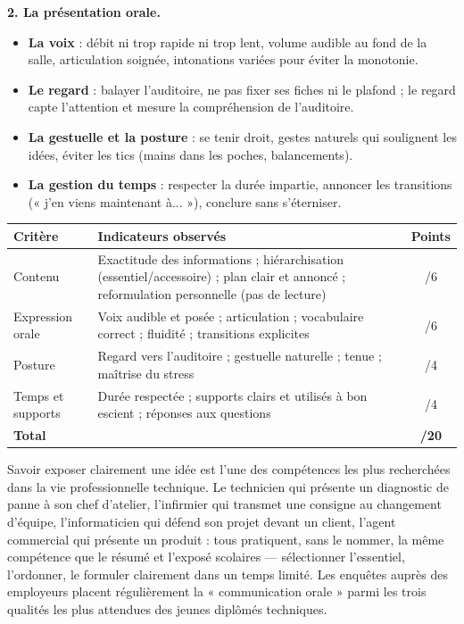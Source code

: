 \documentclass[11pt]{article}
\begin{document}
\textbf{2. La présentation orale.}
\begin{itemize}
\item \textbf{La voix} : débit ni trop rapide ni trop lent, volume audible au fond de la salle, articulation soignée, intonations variées pour éviter la monotonie.
\item \textbf{Le regard} : balayer l'auditoire, ne pas fixer ses fiches ni le plafond ; le regard capte l'attention et mesure la compréhension de l'auditoire.
\item \textbf{La gestuelle et la posture} : se tenir droit, gestes naturels qui soulignent les idées, éviter les tics (mains dans les poches, balancements).
\item \textbf{La gestion du temps} : respecter la durée impartie, annoncer les transitions (« j'en viens maintenant à... »), conclure sans s'éterniser.
\end{itemize}

\begin{center}
\begin{tabularx}{\linewidth}{|l|X|c|}
\hline
\rowcolor{popblueL} \textbf{Critère} & \textbf{Indicateurs observés} & \textbf{Points} \\
\hline
Contenu & Exactitude des informations ; hiérarchisation (essentiel/accessoire) ; plan clair et annoncé ; reformulation personnelle (pas de lecture) & /6 \\
\hline
Expression orale & Voix audible et posée ; articulation ; vocabulaire correct ; fluidité ; transitions explicites & /6 \\
\hline
Posture & Regard vers l'auditoire ; gestuelle naturelle ; tenue ; maîtrise du stress & /4 \\
\hline
Temps et supports & Durée respectée ; supports clairs et utilisés à bon escient ; réponses aux questions & /4 \\
\hline
\rowcolor{popgreenL} \textbf{Total} & & \textbf{/20} \\
\hline
\end{tabularx}
\end{center}

\begin{savaistu}
Savoir exposer clairement une idée est l'une des compétences les plus recherchées dans la vie professionnelle technique. Le technicien qui présente un diagnostic de panne à son chef d'atelier, l'infirmier qui transmet une consigne au changement d'équipe, l'informaticien qui défend son projet devant un client, l'agent commercial qui présente un produit : tous pratiquent, sans le nommer, la même compétence que le résumé et l'exposé scolaires — sélectionner l'essentiel, l'ordonner, le formuler clairement dans un temps limité. Les enquêtes auprès des employeurs placent régulièrement la « communication orale » parmi les trois qualités les plus attendues des jeunes diplômés techniques.
\end{savaistu}
\end{document}
